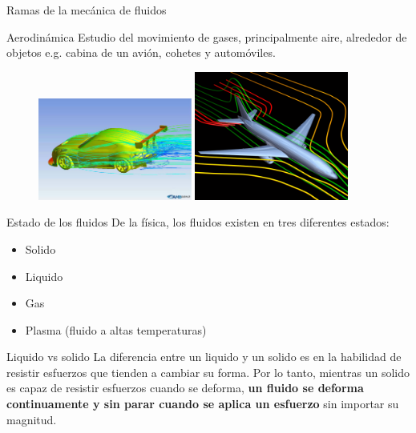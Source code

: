 \documentclass [xcolor=svgnames, t] {beamer}
\begin{document}
\begin{frame}{Ramas de la mecánica de fluidos}
\begin{block}{Aerodinámica}
Estudio del movimiento de gases, principalmente aire, alrededor de objetos e.g. cabina de un avión, cohetes y automóviles.
\end{block}
\begin{figure}
\centering
\includegraphics[width=0.45\textwidth]{aero1}
\includegraphics[width=0.45\textwidth]{aero2}
\end{figure}
\end{frame}

\begin{frame}{Estado de los fluidos}
De la física, los fluidos existen en tres diferentes estados:
\begin{itemize}
\item Solido
\item Liquido 
\item Gas
\item Plasma (fluido a altas temperaturas)
\end{itemize}
 
\begin{exampleblock}{Liquido vs solido}
La diferencia entre un liquido y un solido es en la habilidad de resistir esfuerzos que tienden a cambiar su forma. Por lo tanto, mientras un solido es capaz de resistir esfuerzos cuando se deforma, \textbf{un fluido se deforma continuamente y sin parar cuando se aplica un esfuerzo} sin importar su magnitud. 
\end{exampleblock}
\end{frame}
\end{document}
